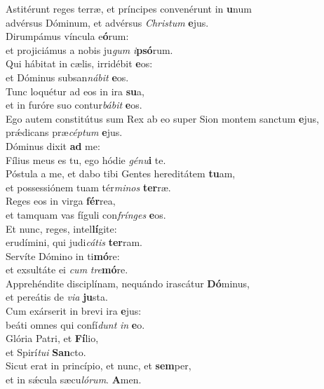 \evenverse Astitérunt reges terræ, et príncipes convenérunt in \textbf{u}num~\*\\
\evenverse advérsus Dóminum, et advérsus \textit{Chri}\textit{stum} \textbf{e}jus.\\
\oddverse Dirumpámus víncula e\textbf{ó}rum:~\*\\
\oddverse et projiciámus a nobis ju\textit{gum} \textit{i}\textbf{psó}rum.\\
\evenverse Qui hábitat in cælis, irridébit \textbf{e}os:~\*\\
\evenverse et Dóminus subsan\textit{ná}\textit{bit} \textbf{e}os.\\
\oddverse Tunc loquétur ad eos in ira \textbf{su}a,~\*\\
\oddverse et in furóre suo contur\textit{bá}\textit{bit} \textbf{e}os.\\
\evenverse Ego autem constitútus sum Rex ab eo super Sion montem sanctum \textbf{e}jus,~\*\\
\evenverse prǽdicans præ\textit{cép}\textit{tum} \textbf{e}jus.\\
\oddverse Dóminus dixit \textbf{ad} me:~\*\\
\oddverse Fílius meus es tu, ego hódie \textit{gé}\textit{nu}\textbf{i} te.\\
\evenverse Póstula a me, et dabo tibi Gentes hereditátem \textbf{tu}am,~\*\\
\evenverse et possessiónem tuam tér\textit{mi}\textit{nos} \textbf{ter}ræ.\\
\oddverse Reges eos in virga \textbf{fér}rea,~\*\\
\oddverse et tamquam vas fíguli con\textit{frín}\textit{ges} \textbf{e}os.\\
\evenverse Et nunc, reges, intel\textbf{lí}gite:~\*\\
\evenverse erudímini, qui judi\textit{cá}\textit{tis} \textbf{ter}ram.\\
\oddverse Servíte Dómino in ti\textbf{mó}re:~\*\\
\oddverse et exsultáte ei \textit{cum} \textit{tre}\textbf{mó}re.\\
\evenverse Apprehéndite disciplínam, nequándo irascátur \textbf{Dó}minus,~\*\\
\evenverse et pereátis de \textit{vi}\textit{a} \textbf{ju}sta.\\
\oddverse Cum exárserit in brevi ira \textbf{e}jus:~\*\\
\oddverse beáti omnes qui confí\textit{dunt} \textit{in} \textbf{e}o.\\
\evenverse Glória Patri, et \textbf{Fí}lio,~\*\\
\evenverse et Spirí\textit{tu}\textit{i} \textbf{San}cto.\\
\oddverse Sicut erat in princípio, et nunc, et \textbf{sem}per,~\*\\
\oddverse et in sǽcula sæcu\textit{ló}\textit{rum}. \textbf{A}men.\\
